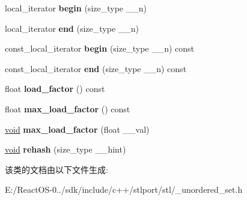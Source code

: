 \begin{DoxyCompactItemize}
local\+\_\+iterator {\bfseries begin} (size\+\_\+type \+\_\+\+\_\+n)
\item 
\mbox{\label{classunordered__multiset_acd9eb31cffae51ae4ed7d3a25032358a}} 
local\+\_\+iterator {\bfseries end} (size\+\_\+type \+\_\+\+\_\+n)
\item 
\mbox{\label{classunordered__multiset_af6dbb83a06546de7453e69b395080071}} 
const\+\_\+local\+\_\+iterator {\bfseries begin} (size\+\_\+type \+\_\+\+\_\+n) const
\item 
\mbox{\label{classunordered__multiset_a123a60dff818439c288092be405881c5}} 
const\+\_\+local\+\_\+iterator {\bfseries end} (size\+\_\+type \+\_\+\+\_\+n) const
\item 
\mbox{\label{classunordered__multiset_a37ef0fdf51f0e5bdbfe476684b827d68}} 
float {\bfseries load\+\_\+factor} () const
\item 
\mbox{\label{classunordered__multiset_ae8987ea3f6f149562e30e1fceb8c4518}} 
float {\bfseries max\+\_\+load\+\_\+factor} () const
\item 
\mbox{\label{classunordered__multiset_a9481ca30bd10982148f0e3ac37697542}} 
\hyperlink{interfacevoid}{void} {\bfseries max\+\_\+load\+\_\+factor} (float \+\_\+\+\_\+val)
\item 
\mbox{\label{classunordered__multiset_a0697a838b6d72908e6f754f0bfe86c2c}} 
\hyperlink{interfacevoid}{void} {\bfseries rehash} (size\+\_\+type \+\_\+\+\_\+hint)
\end{DoxyCompactItemize}


该类的文档由以下文件生成\+:\begin{DoxyCompactItemize}
\item 
E\+:/\+React\+O\+S-\/0../sdk/include/c++/stlport/stl/\+\_\+unordered\+\_\+set.\+h\end{DoxyCompactItemize}
